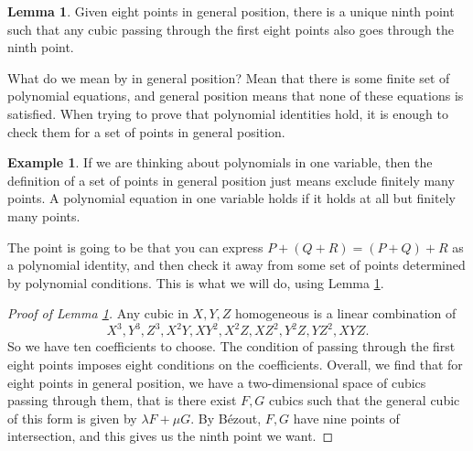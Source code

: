 \documentclass{article}
\newcommand{\rb}[1]{\left( #1 \right)}
\theoremstyle{definition}\newtheorem{definition}{Definition}[section]
\theoremstyle{definition}\newtheorem{remark}[definition]{Remark}
\theoremstyle{definition}\newtheorem*{example}{Example}
\theoremstyle{definition}\newtheorem*{note}{Note}
\newtheorem{lemma}[definition]{Lemma}
\begin{document}
\begin{lemma}
\label{lem:5.7}
Given eight points in general position, there is a unique ninth point such that any cubic passing through the first eight points also goes through the ninth point.
\end{lemma}

What do we mean by in general position? Mean that there is some finite set of polynomial equations, and general position means that none of these equations is satisfied. When trying to prove that polynomial identities hold, it is enough to check them for a set of points in general position.

\begin{example}
If we are thinking about polynomials in one variable, then the definition of a set of points in general position just means exclude finitely many points. A polynomial equation in one variable holds if it holds at all but finitely many points.
\end{example}

The point is going to be that you can express $ P + \rb{Q + R} = \rb{P + Q} + R $ as a polynomial identity, and then check it away from some set of points determined by polynomial conditions. This is what we will do, using Lemma \ref{lem:5.7}.

\begin{proof}[Proof of Lemma \ref{lem:5.7}]
Any cubic in $ X, Y, Z $ homogeneous is a linear combination of
$$ X^3, Y^3, Z^3, X^2Y, XY^2, X^2Z, XZ^2, Y^2Z, YZ^2, XYZ. $$
So we have ten coefficients to choose. The condition of passing through the first eight points imposes eight conditions on the coefficients. Overall, we find that for eight points in general position, we have a two-dimensional space of cubics passing through them, that is there exist $ F, G $ cubics such that the general cubic of this form is given by $ \lambda F + \mu G $. By Bézout, $ F, G $ have nine points of intersection, and this gives us the ninth point we want.
\end{proof}


\begin{center}
\end{center}
\end{document}
